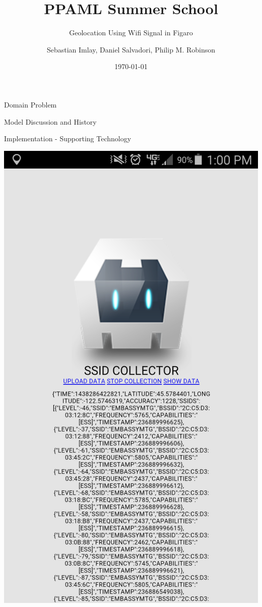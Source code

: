 \documentclass[11pt]{beamer}
\begin{document}
\title{PPAML Summer School}

\subtitle{Geolocation Using Wifi Signal in Figaro}

\author{Sebastian Imlay, Daniel Salvadori, Philip M. Robinson}


\date{\today}

\begin{frame}
  \titlepage
\end{frame}


\begin{frame}{Domain Problem}

\end{frame}

\begin{frame}{Model Discussion and History}

\end{frame}

\begin{frame}{Implementation - Supporting Technology}

\includegraphics[height=0.7\textheight]{pictures/phoneapp.png}
\end{frame}
\end{document}
